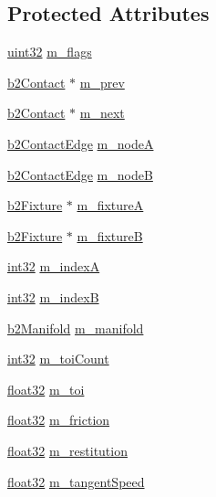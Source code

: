 \subsection*{Protected Attributes}
\begin{DoxyCompactItemize}
\item 
\mbox{\hyperlink{b2_settings_8h_a1134b580f8da4de94ca6b1de4d37975e}{uint32}} \mbox{\hyperlink{classb2_contact_a85d5408adcbf466bcb8f291aeb35bc3b}{m\+\_\+flags}}
\item 
\mbox{\hyperlink{classb2_contact}{b2\+Contact}} $\ast$ \mbox{\hyperlink{classb2_contact_adf3a3450e0fa9cf6d11ca22467c2370b}{m\+\_\+prev}}
\item 
\mbox{\hyperlink{classb2_contact}{b2\+Contact}} $\ast$ \mbox{\hyperlink{classb2_contact_a241fea000d26da8761b5520a9adcd87a}{m\+\_\+next}}
\item 
\mbox{\hyperlink{structb2_contact_edge}{b2\+Contact\+Edge}} \mbox{\hyperlink{classb2_contact_a5f5ce747bb04f48843eb07304d47faab}{m\+\_\+nodeA}}
\item 
\mbox{\hyperlink{structb2_contact_edge}{b2\+Contact\+Edge}} \mbox{\hyperlink{classb2_contact_a4887c3acb8cb857e2bec659027539c7a}{m\+\_\+nodeB}}
\item 
\mbox{\hyperlink{classb2_fixture}{b2\+Fixture}} $\ast$ \mbox{\hyperlink{classb2_contact_aec94bbbb8862f09365a5af99650b5be4}{m\+\_\+fixtureA}}
\item 
\mbox{\hyperlink{classb2_fixture}{b2\+Fixture}} $\ast$ \mbox{\hyperlink{classb2_contact_a83b18f0da1cfeb2c9dccc6aabed881d3}{m\+\_\+fixtureB}}
\item 
\mbox{\hyperlink{b2_settings_8h_a43d43196463bde49cb067f5c20ab8481}{int32}} \mbox{\hyperlink{classb2_contact_ac69d3c8f18ac653cbff658a718ab9067}{m\+\_\+indexA}}
\item 
\mbox{\hyperlink{b2_settings_8h_a43d43196463bde49cb067f5c20ab8481}{int32}} \mbox{\hyperlink{classb2_contact_aaaae6d149986c7267f3e28f0c58da8a0}{m\+\_\+indexB}}
\item 
\mbox{\hyperlink{structb2_manifold}{b2\+Manifold}} \mbox{\hyperlink{classb2_contact_aebdc2c073d05ac8e544a591d2043b251}{m\+\_\+manifold}}
\item 
\mbox{\hyperlink{b2_settings_8h_a43d43196463bde49cb067f5c20ab8481}{int32}} \mbox{\hyperlink{classb2_contact_afaa231f3e9a908154f9a32af456601b6}{m\+\_\+toi\+Count}}
\item 
\mbox{\hyperlink{b2_settings_8h_aacdc525d6f7bddb3ae95d5c311bd06a1}{float32}} \mbox{\hyperlink{classb2_contact_aa9e75253eaac6efdb6485a8646ac553f}{m\+\_\+toi}}
\item 
\mbox{\hyperlink{b2_settings_8h_aacdc525d6f7bddb3ae95d5c311bd06a1}{float32}} \mbox{\hyperlink{classb2_contact_ac7915ef6f92d609ee0a43d518b4f9e75}{m\+\_\+friction}}
\item 
\mbox{\hyperlink{b2_settings_8h_aacdc525d6f7bddb3ae95d5c311bd06a1}{float32}} \mbox{\hyperlink{classb2_contact_a6bc56522b4c04e28bee3542a7fc2f796}{m\+\_\+restitution}}
\item 
\mbox{\hyperlink{b2_settings_8h_aacdc525d6f7bddb3ae95d5c311bd06a1}{float32}} \mbox{\hyperlink{classb2_contact_a70bbcb5cf7ade19ad986a6a1168e2b89}{m\+\_\+tangent\+Speed}}
\end{DoxyCompactItemize}
